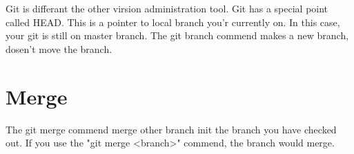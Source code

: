 \vspace{2cm}

Git is differant the other virsion administration tool. Git
has a special point called HEAD. This is a pointer to local branch you'r currently on. In this case, your git is still on master branch. The git branch commend makes a new branch, dosen't move the branch. 

\section{Merge}
The git merge commend merge other branch init the branch you have checked out. If you use the "git merge <branch>" commend, the branch would merge.  